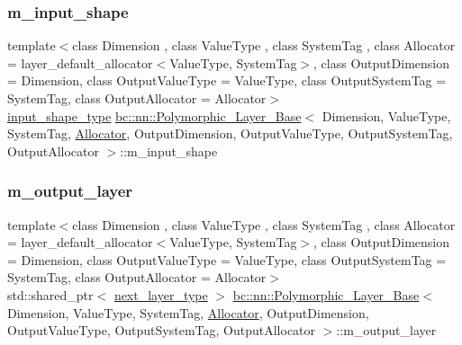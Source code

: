 \mbox{\label{structbc_1_1nn_1_1Polymorphic__Layer__Base_a0e1021b5d112fed042d030eb5d44b7c2}} 
\subsubsection{\texorpdfstring{m\+\_\+input\+\_\+shape}{m\_input\_shape}}
{\footnotesize\ttfamily template$<$class Dimension , class Value\+Type , class System\+Tag , class Allocator  = layer\+\_\+default\+\_\+allocator$<$\+Value\+Type, System\+Tag$>$, class Output\+Dimension  = Dimension, class Output\+Value\+Type  = Value\+Type, class Output\+System\+Tag  = System\+Tag, class Output\+Allocator  = Allocator$>$ \\
\hyperlink{structbc_1_1nn_1_1Polymorphic__Layer__Base_ad69ba46ce14f9fbef88b834828052ab4}{input\+\_\+shape\+\_\+type} \hyperlink{structbc_1_1nn_1_1Polymorphic__Layer__Base}{bc\+::nn\+::\+Polymorphic\+\_\+\+Layer\+\_\+\+Base}$<$ Dimension, Value\+Type, System\+Tag, \hyperlink{classbc_1_1allocators_1_1Allocator}{Allocator}, Output\+Dimension, Output\+Value\+Type, Output\+System\+Tag, Output\+Allocator $>$\+::m\+\_\+input\+\_\+shape\hspace{0.3cm}{\ttfamily [protected]}}

\mbox{\label{structbc_1_1nn_1_1Polymorphic__Layer__Base_a9fed7a02ea5b0ea5bea55e8060e1ded2}} 
\subsubsection{\texorpdfstring{m\+\_\+output\+\_\+layer}{m\_output\_layer}}
{\footnotesize\ttfamily template$<$class Dimension , class Value\+Type , class System\+Tag , class Allocator  = layer\+\_\+default\+\_\+allocator$<$\+Value\+Type, System\+Tag$>$, class Output\+Dimension  = Dimension, class Output\+Value\+Type  = Value\+Type, class Output\+System\+Tag  = System\+Tag, class Output\+Allocator  = Allocator$>$ \\
std\+::shared\+\_\+ptr$<$ \hyperlink{structbc_1_1nn_1_1Polymorphic__Layer__Base_ac7d70db83e8370d2975d05401713f677}{next\+\_\+layer\+\_\+type} $>$ \hyperlink{structbc_1_1nn_1_1Polymorphic__Layer__Base}{bc\+::nn\+::\+Polymorphic\+\_\+\+Layer\+\_\+\+Base}$<$ Dimension, Value\+Type, System\+Tag, \hyperlink{classbc_1_1allocators_1_1Allocator}{Allocator}, Output\+Dimension, Output\+Value\+Type, Output\+System\+Tag, Output\+Allocator $>$\+::m\+\_\+output\+\_\+layer\hspace{0.3cm}{\ttfamily [protected]}}

